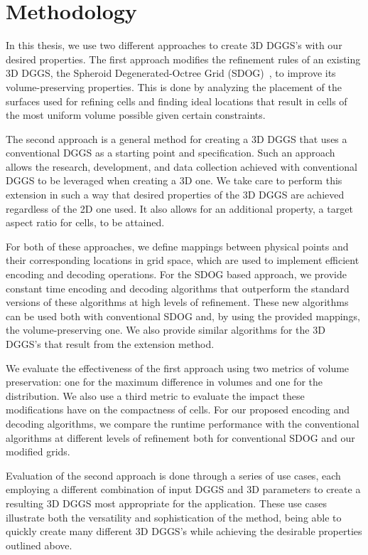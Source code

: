 \section{Methodology}
In this thesis, we use two different approaches to create 3D DGGS's with our desired properties.
The first approach modifies the refinement rules of an existing 3D DGGS, the Spheroid Degenerated-Octree Grid (SDOG)~\cite{yu2009sdog}, to improve its volume-preserving properties.
This is done by analyzing the placement of the surfaces used for refining cells and finding ideal locations that result in cells of the most uniform volume possible given certain constraints.


The second approach is a general method for creating a 3D DGGS that uses a conventional DGGS as a starting point and specification.
Such an approach allows the research, development, and data collection achieved with conventional DGGS to be leveraged when creating a 3D one.
We take care to perform this extension in such a way that desired properties of the 3D DGGS are achieved regardless of the 2D one used.
It also allows for an additional property, a target aspect ratio for cells, to be attained.


For both of these approaches, we define mappings between physical points and their corresponding locations in grid space, which are used to implement efficient encoding and decoding operations.
For the SDOG based approach, we provide constant time encoding and decoding algorithms that outperform the standard versions of these algorithms at high levels of refinement.
These new algorithms can be used both with conventional SDOG and, by using the provided mappings, the volume-preserving one.
We also provide similar algorithms for the 3D DGGS's that result from the extension method.


We evaluate the effectiveness of the first approach using two metrics of volume preservation: one for the maximum difference in volumes and one for the distribution.
We also use a third metric to evaluate the impact these modifications have on the compactness of cells.
For our proposed encoding and decoding algorithms, we compare the runtime performance with the conventional algorithms at different levels of refinement both for conventional SDOG and our modified grids.


Evaluation of the second approach is done through a series of use cases, each employing a different combination of input DGGS and 3D parameters to create a resulting 3D DGGS most appropriate for the application.
These use cases illustrate both the versatility and sophistication of the method, being able to quickly create many different 3D DGGS's while achieving the desirable properties outlined above.


